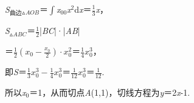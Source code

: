 \documentclass{article} %
\begin{document}
\textit{S}${}_{\textrm{曲}\textrm{边}}$${}_{\mathrm{\vartriangle }}$\textit{${}_{AOB}$}＝$\int$\textit{x}${}_{00}$\textit{x}${}^{2}$d\textit{x}＝$\frac{1}{3}$\textit{x}，

\textit{S}${}_{\mathrm{\vartriangle }}$\textit{${}_{ABC}$}＝$\frac{1}{2}$|\textit{BC}|·|\textit{AB}|

＝$\frac{1}{2}(x_0-\frac{x_0}{2})\cdot x_0^2$＝$\frac{1}{4}x_0^3$，

即\textit{S}＝$\frac{1}{3}x_0^3-\frac{1}{4}x_0^3$＝$\frac{1}{12}x_0^3$＝$\frac{1}{12}$.

所以\textit{x}${}_{0}$＝1，从而切点\textit{A}(1,1)，切线方程为\textit{y}＝2\textit{x}-1.
\end{document}
